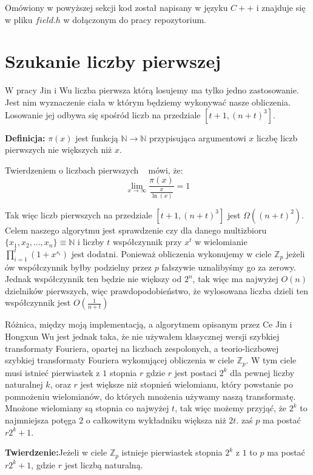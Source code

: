 \documentclass{article}
\begin{document}
Omówiony w powyższej sekcji kod został napisany w języku $C++$ i znajduje się w 
pliku $field.h$ w dołączonym do pracy repozytorium.


\section{Szukanie liczby pierwszej}
W pracy Jin i Wu liczba pierwsza którą losujemy ma tylko jedno zastosowanie. Jest nim
wyznaczenie ciała w którym będziemy wykonywać nasze obliczenia. Losowanie jej odbywa się 
spośród liczb na przedziale $[t+1,(n+t)^3]$. 

\begin{tcolorbox}
        \textbf{Definicja:} $\pi(x)$ jest funkcją $\mathbb{N}\to\mathbb{N}$ przypisująca argumentowi $x$ liczbę 
        liczb pierwszych nie większych niż $x$.
\end{tcolorbox}

Twierdzeniem o liczbach pierwszych ~\cite{goldfeld2004elementary} mówi, że: 
$$\lim_{x \to \infty} \frac{\pi(x)}{\frac{x}{\ln(x)}}=1$$

Tak więc liczb pierwszych na przedziale $[t+1,(n+t)^3]$ jest $\Omega((n+t)^2)$. Celem naszego algorytmu jest sprawdzenie
czy dla danego multizbioru $\{x_1,x_2,...,x_n\} \equiv \mathbb{N}$ i liczby $t$ współczynnik przy $x^t$ w wielomianie 
$\prod_{i=1}^{t}(1+x^{s_i})$ jest dodatni. Ponieważ obliczenia wykonujemy w ciele $\mathbb{Z}_p$ jeżeli 
ów współczynnik byłby podzielny przez $p$ fałszywie uznalibyśmy go za zerowy. Jednak współczynnik ten będzie 
nie większy od $2^n$, tak więc ma najwyżej $O(n)$ dzielników pierwszych, więc prawdopodobieństwo, że wylosowana
liczba dzieli ten współczynnik jest $O(\frac{1}{n+t})$

Różnica, między moją implementacją, a algorytmem opisanym przez Ce Jin i Hongxun Wu jest 
jednak taka, że nie używałem klasycznej wersji szybkiej transformaty Fouriera, opartej na
liczbach zespolonych, a teorio-liczbowej szybkiej transformaty Fouriera wykonującej obliczenia
w ciele $\mathbb{Z}_p$. W tym ciele musi istnieć pierwiastek z $1$ stopnia $r$ gdzie
$r$ jest postaci $2^k$ dla pewnej liczby naturalnej $k$, oraz $r$ jest większe niż 
stopnień wielomianu, który powstanie po pomnożeniu wielomianów, do których mnożenia używamy naszą 
transformatę. Mnożone wielomiany są stopnia co najwyżej $t$, tak więc
możemy przyjąć, że $2^k$ to najmniejsza potęga $2$ o całkowitym wykładniku większa niż 
$2t$. zaś $p$ ma postać $r2^k+1$. 
\begin{tcolorbox}
    \textbf{Twierdzenie:}Jeżeli w ciele $\mathbb{Z}_p$ istnieje pierwiastek stopnia $2^k$ z $1$ to $p$ ma postać $r2^k+1$, gdzie $r$ jest liczbą naturalną.
\end{tcolorbox}
\end{document}
